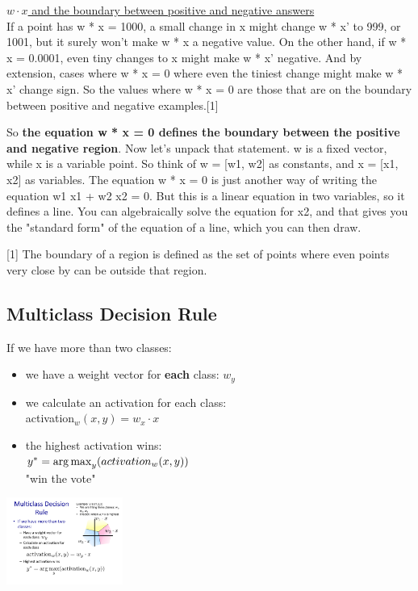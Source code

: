 \underline{$w \cdot x$ and the boundary between positive and negative answers} \hfill \\
If a point has w * x = 1000, a small change in x might change w * x' to 999, or 1001, but it surely won't make w * x a negative value. On the other hand, if w * x = 0.0001, even tiny changes to x might make w * x' negative. And by extension, cases where w * x = 0 where even the tiniest change might make w * x' change sign. So the values where w * x = 0 are those that are on the boundary between positive and negative examples.[1]

So \textbf{the equation w * x = 0 defines the boundary between the positive and negative region}. Now let's unpack that statement. w is a fixed vector, while x is a variable point. So think of w = [w1, w2] as constants, and x = [x1, x2] as variables. The equation w * x = 0 is just another way of writing the equation w1 x1 + w2 x2 = 0. But this is a linear equation in two variables, so it defines a line. You can algebraically solve the equation for x2, and that gives you the "standard form" of the equation of a line, which you can then draw.

[1] The boundary of a region is defined as the set of points where even points very close by can be outside that region.

 
 \subsection{Multiclass Decision Rule}
 If we have more than two classes: 
 \begin{itemize}
 	\item we have a weight vector for \textbf{each} class: $w_y$
	\item we calculate an activation for each class: \hfill \\
		activation$_w(x,y) = w_x \cdot x$
	\item the highest activation wins:  \hfill \\
		$y^* = \operatorname*{arg\,max}_y(activation_w(x,y))$ \hfill \\
		"win the vote" 
 \end{itemize}
 
\includegraphics[width=1.5in]{figures/multiclass_decision_rule_planes.pdf}
 
